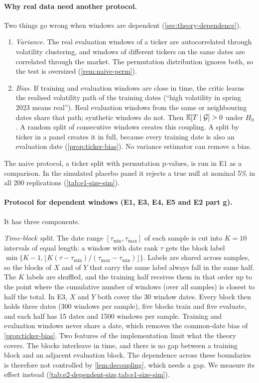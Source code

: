 \paragraph{Why real data need another protocol.}
Two things go wrong when windows are dependent (\cref{sec:theory-dependence}).
\begin{enumerate}
  \item \emph{Variance.} The real evaluation windows of a ticker are autocorrelated through
    volatility clustering, and windows of different tickers on the same dates are correlated
    through the market. The permutation distribution ignores both, so the test is oversized
    (\cref{rem:naive-perm}).
  \item \emph{Bias.} If training and evaluation windows are close in time, the critic learns the
    realised volatility path of the training dates (``high volatility in spring 2023 means
    real''). Real evaluation windows from the same or neighbouring dates share that path;
    synthetic windows do not. Then $\mathbb{E}[T\mid\mathcal{G}]>0$ under $H_0$. A random split of
    consecutive windows creates this coupling. A split by ticker in a panel creates it in full,
    because every training date is also an evaluation date (\cref{prop:ticker-bias}). No
    variance estimator can remove a bias.
\end{enumerate}
The naive protocol, a ticker split with permutation p-values, is run in E1 as a comparison.
In the simulated placebo panel it rejects a true null at nominal 5\% in all 200 replications
(\cref{tab:e1-size-sim}).

\paragraph{Protocol for dependent windows (E1, E3, E4, E5 and E2 part g).}
It has three components.

\emph{Time-block split.} The date range $[\tau_{\min},\tau_{\max}]$ of each sample is cut into
$K=10$ intervals of equal length: a window with date rank $\tau$ gets the block label
$\min\{K-1,\lfloor K(\tau-\tau_{\min})/(\tau_{\max}-\tau_{\min})\rfloor\}$. Labels are shared
across samples, so the blocks of $X$ and of $Y$ that carry the same label always fall in the
same half.
The $K$ labels are shuffled, and the training half receives them in that order up to the point
where the cumulative number of windows (over all samples) is closest to half the total. In E3,
$X$ and $Y$ both cover the 30 \TEST{} window dates. Every block then holds three dates (300
windows per sample), five blocks train and five evaluate, and each half has 15 dates and 1500
windows per sample. Training and evaluation windows never share a date, which removes the
common-date bias of \cref{prop:ticker-bias}. Two features of the implementation limit what the
theory covers. The blocks interleave in time, and there is no gap between a training block and
an adjacent evaluation block. The dependence across these boundaries is therefore not
controlled by \cref{lem:decoupling}, which needs a gap. We measure its effect instead
(\cref{tab:e2-dependent-size,tab:e1-size-sim}).

